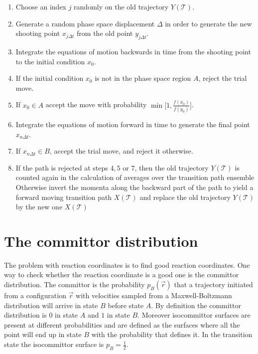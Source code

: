 	\begin{enumerate}
		\item Choose an index $j$ randomly on the old trajectory $Y(\mathcal{T})$.
		\item Generate a random phase space displacement $\Delta$ in order to generate the new shooting point $x_{j\Delta t}$ from the old point $y_{j\Delta t}$.
		\item Integrate the equations of motion backwards in time from the shooting point to the initial condition $x_0$.
		\item If the initial condition $x_0$ is not in the phase space region $A$, reject the trial move.
		\item If $x_0\in A$ accept the move with probability $\min\biggl[1,\frac{f(x_0)}{f(y_0)}\biggr]$.
		\item Integrate the equations of motion forward in time to generate the final point $x_{n\Delta t}$.
		\item If $x_{n\Delta t}\in B$, accept the trial move, and reject it otherwise.
		\item If the path is rejected at steps $4, 5$ or $7$, then the old trajectory $Y(\mathcal{T})$ is counted again in the calculation of averages over the transition path ensemble
			Otherwise invert the momenta along the backward part of the path to yield a forward moving transition path $X(\mathcal{T})$ and replace the old trajectory $Y(\mathcal{T})$ by the new one $X(\mathcal{T})$
	\end{enumerate}

\section{The committor distribution}
The problem with reaction coordinates is to find good reaction coordinates.
One way to check whether the reaction coordinate is a good one is the committor distribution.
The committor is the probability $p_B(\vec{r})$ that a trajectory initiated from a configuration $\vec{r}$ with velocities sampled from a Maxwell-Boltzmann distribution will arrive in state $B$ before state $A$.
By definition the committor distribution is $0$ in state $A$ and $1$ in state $B$.
Moreover isocommittor surfaces are present at different probabilities and are defined as the surfaces where all the point will end up in state $B$ with the probability that defines it.
In the transition state the isocommittor surface is $p_B = \frac{1}{2}$.

